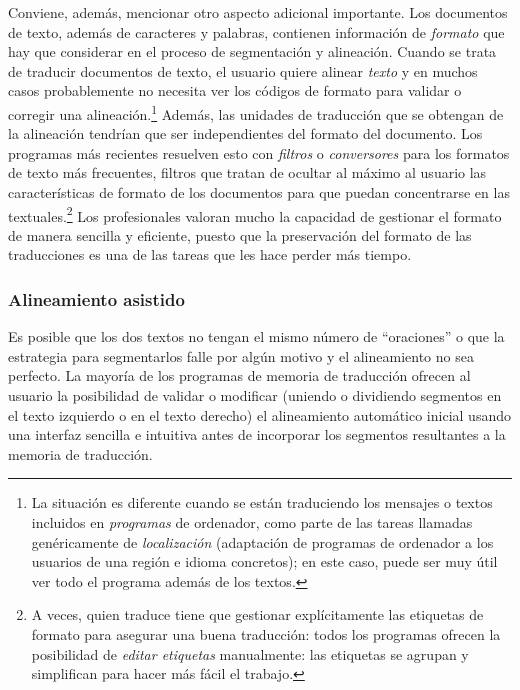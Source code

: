 Conviene, además, mencionar otro aspecto adicional importante. Los documentos de texto, además de caracteres y palabras, contienen información de \emph{formato} que hay que considerar en el proceso de segmentación y alineación. Cuando se trata de traducir documentos de texto, el usuario quiere alinear \emph{texto} y en muchos casos probablemente no necesita ver los códigos de formato para validar o corregir una alineación.\footnote{La situación es diferente cuando se están traduciendo los mensajes o textos incluidos en \emph{programas} de ordenador, como parte de las tareas llamadas genéricamente de \emph{localización} (adaptación de programas de ordenador a los usuarios de una región e idioma concretos); en este caso, puede ser muy útil ver todo el programa además de los textos.} Además, las unidades de traducción que se obtengan de la alineación tendrían que ser independientes del formato del documento. Los programas más recientes resuelven esto con \emph{filtros} o \emph{conversores} para los formatos de texto más frecuentes, filtros que tratan de ocultar al máximo al usuario las características de formato de los documentos para que puedan concentrarse en las textuales.\footnote{A veces, quien traduce tiene que gestionar explícitamente las etiquetas de formato para asegurar una buena traducción: todos los programas ofrecen la posibilidad de \emph{editar etiquetas} manualmente: las etiquetas se agrupan y simplifican para hacer más fácil el trabajo.} Los profesionales valoran mucho la capacidad de gestionar el formato de manera sencilla y eficiente, puesto que la preservación del formato de las traducciones es una de las tareas que les hace perder más tiempo. 

\subsubsection{Alineamiento asistido} 

Es posible que los dos textos no tengan el mismo número de ``oraciones'' o que la estrategia para segmentarlos falle por algún motivo y el alineamiento no sea perfecto. La mayoría de los programas de memoria de traducción ofrecen al usuario la posibilidad de validar o modificar (uniendo o dividiendo segmentos en el texto izquierdo o en el texto derecho) el alineamiento automático inicial usando una interfaz sencilla e intuitiva antes de incorporar los segmentos resultantes a la memoria de traducción. 

